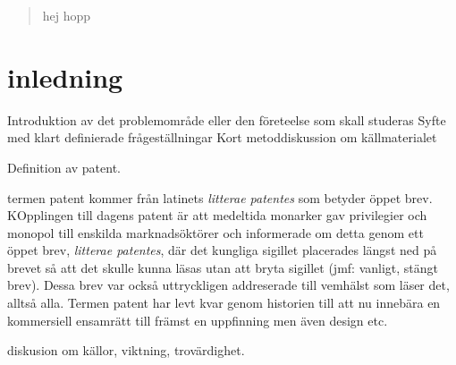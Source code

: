 \begin{abstract}
	hej hopp
\end{abstract}	
	
	
\section{inledning}	
Introduktion av det problemområde eller den företeelse som skall studeras
Syfte med klart definierade frågeställningar
Kort metoddiskussion om källmaterialet

Definition av patent.

termen patent kommer från latinets \emph{litterae patentes} som betyder öppet brev. KOpplingen till dagens patent är att medeltida monarker gav privilegier och monopol till enskilda marknadsöktörer och informerade om detta genom ett öppet brev, \emph{litterae patentes}, där det kungliga sigillet placerades längst ned på brevet så att det skulle kunna läsas utan att bryta sigillet (jmf: vanligt, stängt brev). Dessa brev var också uttryckligen addreserade till vemhälst som läser det, alltså alla. Termen patent har levt kvar genom historien till att nu innebära en kommersiell ensamrätt till främst en uppfinning men även design etc.

diskusion om källor, viktning, trovärdighet.